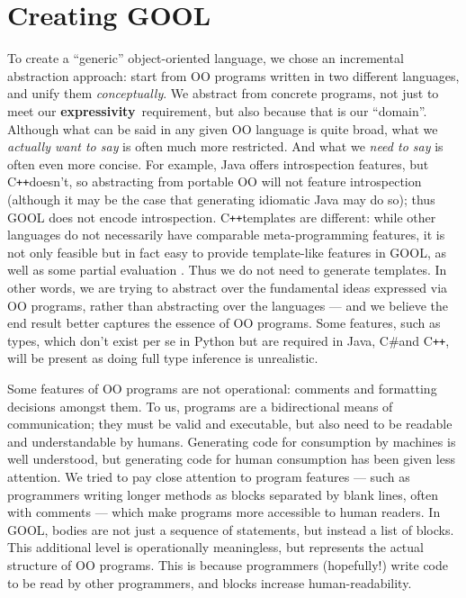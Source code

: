 \documentclass[sigplan,review,prologue,dvipsnames]{acmart}
\newcommand{\Csharp}{C\#}
\newcommand{\Cplusplus}{C\texttt{++}}
\newcommand{\abbrev}[1]{\textbf{#1}}
\newcommand{\expressivity}{\abbrev{expressivity}}
\begin{document}
\section{Creating GOOL} \label{sec:creating}

To create a ``generic'' object-oriented language,
we chose an incremental abstraction approach: start from OO programs written in 
two different languages, and unify them \emph{conceptually}.
We abstract from concrete programs, not just to meet our
\expressivity~requirement, but also because that is our ``domain''.  Although
what can be said in any given OO language is quite broad, what we
\emph{actually want to say} is often much more restricted. And what we
\emph{need to say} is often even more concise.
For example, Java offers introspection features, but \Cplusplus doesn't, so
abstracting from portable OO will not feature introspection (although it
may be the case that generating idiomatic Java may do so);
thus GOOL does not encode introspection.  \Cplusplus templates
are different: while other languages do not necessarily have comparable
meta-programming features, it is not only feasible but in fact easy to provide
template-like features in GOOL, as well as some
partial evaluation . Thus we do not need to generate templates.
In other words, we are trying to abstract over the fundamental ideas
expressed via OO programs, rather than abstracting over the languages ---
and we believe the end result better captures the essence of OO programs.
Some features, such as types, which don't exist per se in 
Python but are required in Java, \Csharp and \Cplusplus, will be present
as doing full type inference is unrealistic.

Some features of OO programs are not operational: comments and formatting
decisions amongst them.  To us, programs are a bidirectional means of
communication; they must be valid and executable, but
also need to be readable and understandable by humans.
Generating code for consumption by machines is well understood,
but generating code for human consumption has been given less 
attention. We tried to pay close attention to program features --- such
as programmers writing longer methods as blocks separated
by blank lines, often with comments --- which make programs
more accessible to human readers.
In GOOL, bodies are not just a sequence of statements, but instead a 
list of blocks. This additional level is
operationally meaningless, but represents the actual structure of OO programs.
This is because programmers (hopefully!) write code to 
be read by other programmers, and blocks increase human-readability.
\end{document}
